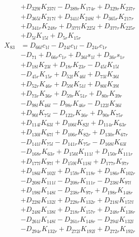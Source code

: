 \begin{multicols}{2}
\begin{align}
&+ D_{329l}K_{237l} - D_{389r}K_{174r} + D_{329r}K_{237r}  \nonumber \\
&+ D_{365l}K_{217l} + D_{341l}K_{248l} + D_{365r}K_{217r}  \nonumber \\
&+ D_{341r}K_{248r} + D_{377l}K_{225l} + D_{377r}K_{225r}  \nonumber \\
&+ D_{5l}K_{15l} + D_{5r}K_{15r} \nonumber \\
X_{83} &= D_{66l}c_{1l} - D_{24l}c_{1l} - D_{24r}c_{1r}  \nonumber \\
&- D_{71} + D_{66r}c_{1r} + D_{36l}s_{1l} + D_{36r}s_{1r}  \nonumber \\
&+ D_{18l}K_{23l} + D_{18r}K_{23r} - D_{45l}K_{15l}  \nonumber \\
&- D_{45r}K_{15r} + D_{52l}K_{46l} + D_{73l}K_{36l}  \nonumber \\
&+ D_{52r}K_{46r} + D_{59l}K_{51l} + D_{80l}K_{39l}  \nonumber \\
&+ D_{73r}K_{36r} + D_{59r}K_{51r} + D_{80r}K_{39r}  \nonumber \\
&- D_{98l}K_{46l} - D_{98r}K_{46r} - D_{122l}K_{36l}  \nonumber \\
&+ D_{90l}K_{75l} - D_{122r}K_{36r} + D_{90r}K_{75r}  \nonumber \\
&+ D_{114l}K_{63l} + D_{106l}K_{82l} + D_{114r}K_{63r}  \nonumber \\
&+ D_{130l}K_{67l} + D_{106r}K_{82r} + D_{130r}K_{67r}  \nonumber \\
&- D_{141l}K_{75l} - D_{141r}K_{75r} - D_{168l}K_{63l}  \nonumber \\
&- D_{168r}K_{63r} + D_{150l}K_{111l} + D_{150r}K_{111r}  \nonumber \\
&+ D_{177l}K_{97l} + D_{159l}K_{118l} + D_{177r}K_{97r}  \nonumber \\
&+ D_{186l}K_{102l} + D_{159r}K_{118r} + D_{186r}K_{102r}  \nonumber \\
&- D_{208l}K_{111l} - D_{208r}K_{111r} - D_{238l}K_{97l}  \nonumber \\
&+ D_{198l}K_{148l} - D_{238r}K_{97r} + D_{198r}K_{148r}  \nonumber \\
&+ D_{228l}K_{132l} + D_{228r}K_{132r} + D_{218l}K_{157l}  \nonumber \\
&+ D_{248l}K_{138l} + D_{218r}K_{157r} + D_{248r}K_{138r}  \nonumber \\
&- D_{261l}K_{148l} - D_{261r}K_{148r} - D_{294l}K_{132l}  \nonumber \\
&- D_{294r}K_{132r} + D_{272l}K_{192l} + D_{272r}K_{192r}  \nonumber \\

\end{align}
\end{multicols}
